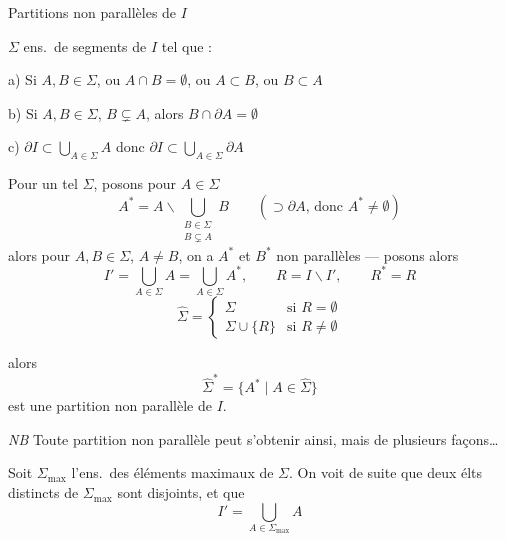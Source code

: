 \documentclass[11pt,a4paper]{article}
\begin{document}
Partitions non parallèles de $I$

$\Sigma$ ens.\ de segments de $I$ tel que :

a) Si $A,B\in\Sigma$, ou $A\cap B=\emptyset$, ou $A\subset B$, ou $B\subset A$

b) Si $A,B\in\Sigma$, $B\subsetneq A$, alors $B\cap\partial A=\emptyset$

c) \struck{\ill{}} $\partial I\subset\bigcup_{A\in\Sigma}A$ donc $\partial
I\subset\bigcup_{A\in\Sigma}\partial A$

Pour un tel $\Sigma$, posons pour $A\in\Sigma$
\[
  A^{*}=A\smallsetminus\bigcup_{\substack{B\in\Sigma\\ B\subsetneq A}}B
  \qquad(\supset\partial A\text{, donc }A^{*}\neq\emptyset)
\]
alors  pour $A,B\in\Sigma$, $A\neq B$,
on a $A^{*}$ et $B^{*}$ non parallèles — posons \struck{\ill{}} alors
\[
  I'=\bigcup_{A\in\Sigma}A=\bigcup_{A\in\Sigma}A^{*},\qquad
  R=I\smallsetminus I',\qquad R^{*}=R
\]
\[
  \widehat{\Sigma}=
  \begin{cases}
    \Sigma & \text{si } R=\emptyset\\
    \Sigma\cup\{R\} & \text{si } R\neq\emptyset
  \end{cases}
\]

alors
\[
  \widehat{\Sigma}^{*}=\{A^{*}\mid A\in\widehat{\Sigma}\}
\]
est une partition non parallèle de $I$.

\emph{NB} Toute partition non parallèle peut s'obtenir ainsi, mais de
plusieurs façons…

Soit $\Sigma_{\max}$ l'ens.\ des éléments maximaux de $\Sigma$. On voit de
suite que deux élts distincts de $\Sigma_{\max}$ sont disjoints, et que
\[
  I'=\bigcup_{A\in\Sigma_{\max}}A
\]
\end{document}
